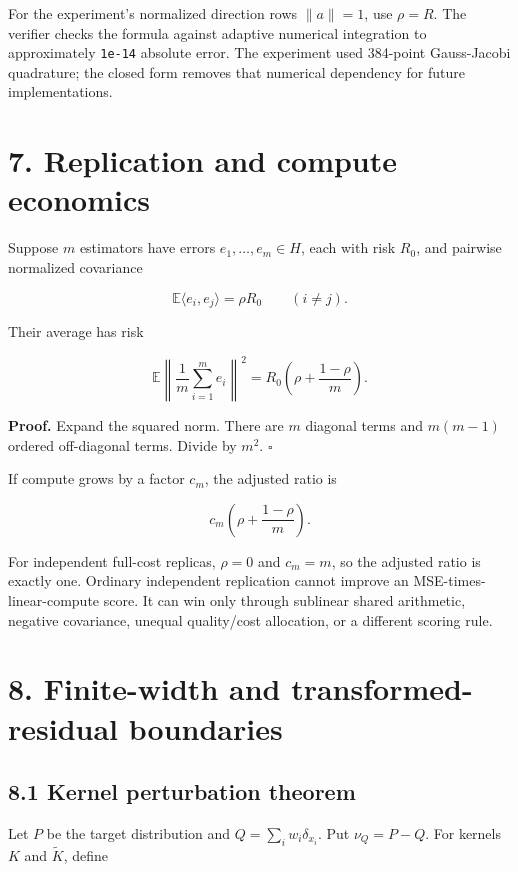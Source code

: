 \documentclass[
  10pt,
]{article}
\begin{document}
For the experiment's normalized direction rows \(\|a\|=1\), use
\(\rho=R\). The verifier checks the formula against adaptive numerical
integration to approximately \texttt{1e-14} absolute error. The
experiment used 384-point Gauss-Jacobi quadrature; the closed form
removes that numerical dependency for future implementations.

\section{7. Replication and compute
economics}\label{replication-and-compute-economics}

Suppose \(m\) estimators have errors \(e_1,\ldots,e_m\in H\), each with
risk \(R_0\), and pairwise normalized covariance

\[
\mathbb E\langle e_i,e_j\rangle=\rho R_0
\qquad(i\ne j).
\]

Their average has risk

\[
\mathbb E\left\|\frac1m\sum_{i=1}^me_i\right\|^2
=
R_0\left(\rho+\frac{1-\rho}{m}\right).
\]

\textbf{Proof.} Expand the squared norm. There are \(m\) diagonal terms
and \(m(m-1)\) ordered off-diagonal terms. Divide by \(m^2\).
\(\square\)

If compute grows by a factor \(c_m\), the adjusted ratio is

\[
c_m\left(\rho+\frac{1-\rho}{m}\right).
\]

For independent full-cost replicas, \(\rho=0\) and \(c_m=m\), so the
adjusted ratio is exactly one. Ordinary independent replication cannot
improve an MSE-times-linear-compute score. It can win only through
sublinear shared arithmetic, negative covariance, unequal quality/cost
allocation, or a different scoring rule.

\section{8. Finite-width and transformed-residual
boundaries}\label{finite-width-and-transformed-residual-boundaries}

\subsection{8.1 Kernel perturbation
theorem}\label{kernel-perturbation-theorem}

Let \(P\) be the target distribution and \(Q=\sum_iw_i\delta_{x_i}\).
Put \(\nu_Q=P-Q\). For kernels \(K\) and \(\widetilde K\), define
\end{document}
